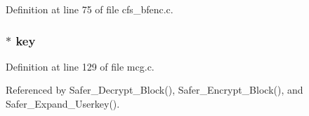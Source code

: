 Definition at line 75 of file cfs\_\-bfenc.c.
\subsubsection{ $\ast$ {\bf key}}\label{cfs__bfenc_8c_a0}




Definition at line 129 of file mcg.c.

Referenced by Safer\_\-Decrypt\_\-Block(), Safer\_\-Encrypt\_\-Block(), and Safer\_\-Expand\_\-Userkey().